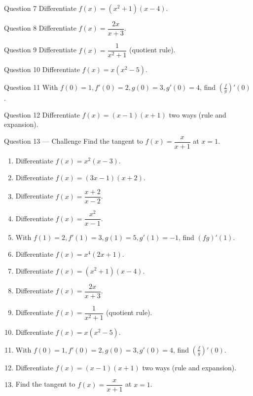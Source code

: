 \documentclass[11pt]{article}
\begin{document}
\begin{qbox}{Question 7}
Differentiate $f(x)=(x^2+1)(x-4)$.\workspace{2.4cm}
\end{qbox}

\begin{qbox}{Question 8}
Differentiate $f(x)=\dfrac{2x}{x+3}$.\workspace{2.4cm}
\end{qbox}

\begin{qbox}{Question 9}
Differentiate $f(x)=\dfrac{1}{x^2+1}$ (quotient rule).\workspace{2.4cm}
\end{qbox}

\begin{qbox}{Question 10}
Differentiate $f(x)=x(x^2-5)$.\workspace{2.4cm}
\end{qbox}

\begin{qbox}{Question 11}
With $f(0)=1,f'(0)=2,g(0)=3,g'(0)=4$, find $\left(\tfrac fg\right)'(0)$.\workspace{2.4cm}
\end{qbox}

\begin{qbox}{Question 12}
Differentiate $f(x)=(x-1)(x+1)$ two ways (rule and expansion).\workspace{2.4cm}
\end{qbox}

\begin{qbox}{Question 13 --- Challenge}
Find the tangent to $f(x)=\dfrac{x}{x+1}$ at $x=1$.\workspace{3cm}
\end{qbox}

\clearpage
{}

\begin{recapbox}
\begin{multicols}{2}
\small
\begin{enumerate}[leftmargin=*,itemsep=3pt]
  \item Differentiate $f(x)=x^2(x-3)$.
  \item Differentiate $f(x)=(3x-1)(x+2)$.
  \item Differentiate $f(x)=\dfrac{x+2}{x-2}$.
  \item Differentiate $f(x)=\dfrac{x^2}{x-1}$.
  \item With $f(1)=2,f'(1)=3,g(1)=5,g'(1)=-1$, find $(fg)'(1)$.
  \item Differentiate $f(x)=x^4(2x+1)$.
  \item Differentiate $f(x)=(x^2+1)(x-4)$.
  \item Differentiate $f(x)=\dfrac{2x}{x+3}$.
  \item Differentiate $f(x)=\dfrac{1}{x^2+1}$ (quotient rule).
  \item Differentiate $f(x)=x(x^2-5)$.
  \item With $f(0)=1,f'(0)=2,g(0)=3,g'(0)=4$, find $\left(\tfrac fg\right)'(0)$.
  \item Differentiate $f(x)=(x-1)(x+1)$ two ways (rule and expansion).
  \item Find the tangent to $f(x)=\dfrac{x}{x+1}$ at $x=1$.
\end{enumerate}
\end{multicols}
\end{recapbox}
\end{document}
